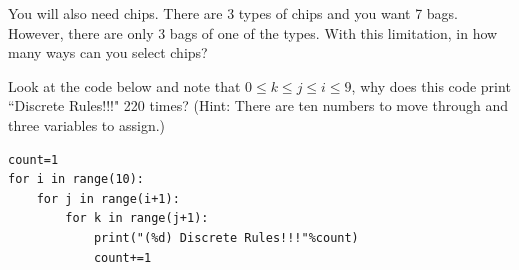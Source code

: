 \begin{practiceprob}
    You will also need chips.  There are 3 types of chips and you want 7 bags.  However, there are only 3 bags of one of the types.  With this limitation, in how many ways can you select chips?
\vspace{0.19\textheight}
\end{practiceprob}

\begin{practiceprob}
Look at the code below and note that \(0\leq k\leq j\leq i\leq 9\), why does this code print ``Discrete Rules!!!" 220 times? (Hint: There are ten numbers to move through and three variables to assign.)

\begin{verbatim}
count=1
for i in range(10):
    for j in range(i+1):
        for k in range(j+1):
            print("(%d) Discrete Rules!!!"%count)
            count+=1
\end{verbatim}

\vspace{0.17\textheight}
\end{practiceprob}